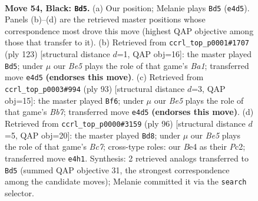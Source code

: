 \documentclass[11pt]{article}
\begin{document}
\clearpage

\begin{figure}[p]\centering
\begin{subfigure}{0.46\textwidth}\centering
\resizebox{\linewidth}{!}{%
\newchessgame
\chessboard[
  setfen={4R3/6k1/8/1pp5/4b3/8/8/5K2 b - - 13 54},
  showmover=false,
  pgfstyle=straightmove, color=movearrow, markmove={e4-d5}
]}
\caption{}
\end{subfigure}\hfill
\begin{subfigure}{0.46\textwidth}\centering
\resizebox{\linewidth}{!}{%
\newchessgame
\chessboard[
  setfen={b4R2/8/p7/6k1/8/4p2K/8/8 b - - 3 62},
  showmover=false,
  pgfstyle=straightmove, color=movearrow, markmove={a8-d5}
]}
\caption{}
\end{subfigure}
\\[4pt]
\begin{subfigure}{0.46\textwidth}\centering
\resizebox{\linewidth}{!}{%
\newchessgame
\chessboard[
  setfen={8/1R6/4p3/p7/6k1/3K4/1b3P2/8 b - - 3 47},
  showmover=false,
  pgfstyle=straightmove, color=movearrow, markmove={b2-f6}
]}
\caption{}
\end{subfigure}\hfill
\begin{subfigure}{0.46\textwidth}\centering
\resizebox{\linewidth}{!}{%
\newchessgame
\chessboard[
  setfen={8/2B5/8/3P1k2/2r5/K7/2P5/8 w - - 14 49},
  showmover=false,
  pgfstyle=straightmove, color=movearrow, markmove={c7-d8}
]}
\caption{}
\end{subfigure}
\caption{\textbf{Move 54, Black: \texttt{Bd5}.} (a) Our position; Melanie plays \texttt{Bd5} (\texttt{e4d5}). Panels (b)--(d) are the retrieved master positions whose correspondence most drove this move (highest QAP objective among those that transfer to it). (b) Retrieved from \texttt{ccrl\_top\_p0001\#1707} (ply 123) [structural distance $d$=1, QAP obj=16]: the master played \texttt{Bd5}; under $\mu$ our \emph{Be5} plays the role of that game's \emph{Ba1}; transferred move \texttt{e4d5} \textbf{(endorses this move)}. (c) Retrieved from \texttt{ccrl\_top\_p0003\#994} (ply 93) [structural distance $d$=3, QAP obj=15]: the master played \texttt{Bf6}; under $\mu$ our \emph{Be5} plays the role of that game's \emph{Bb7}; transferred move \texttt{e4d5} \textbf{(endorses this move)}. (d) Retrieved from \texttt{ccrl\_top\_p0000\#3159} (ply 96) [structural distance $d$=5, QAP obj=20]: the master played \texttt{Bd8}; under $\mu$ our \emph{Be5} plays the role of that game's \emph{Bc7}; cross-type roles: our \emph{B}e4 as their \emph{P}c2; transferred move \texttt{e4h1}. Synthesis: 2 retrieved analogs transferred to \texttt{Bd5} (summed QAP objective 31, the strongest correspondence among the candidate moves); Melanie committed it via the \texttt{search} selector.}
\label{fig:thought-m107}
\end{figure}
\end{document}
